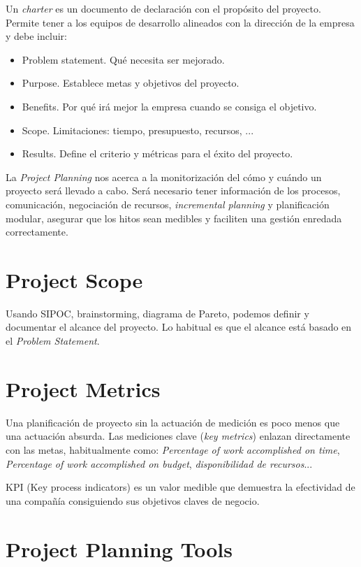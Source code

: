 \documentclass[oneside]{book}
\begin{document}
Un \textit{charter} es un documento de declaración con el propósito del proyecto.
Permite tener a los equipos de desarrollo alineados con la dirección de la empresa y debe incluir: 

\begin{itemize}
	\item Problem statement. Qué necesita ser mejorado.
	\item Purpose. Establece metas y objetivos del proyecto.
	\item Benefits. Por qué irá mejor la empresa cuando se consiga el objetivo.
	\item Scope. Limitaciones: tiempo, presupuesto, recursos, ...
	\item Results. Define el criterio y métricas para el éxito del proyecto.
\end{itemize}

La \textit{Project Planning} nos acerca a la monitorización del cómo y cuándo un proyecto será llevado a cabo. Será necesario tener información de los procesos, comunicación, negociación de recursos, \textit{incremental planning} y planificación modular, asegurar que los hitos sean medibles y faciliten una gestión enredada correctamente.

\section{Project Scope}

Usando SIPOC, brainstorming, diagrama de Pareto, podemos definir y documentar el alcance del proyecto. Lo habitual es que el alcance está basado en el \textit{Problem Statement}.

\section{Project Metrics}

Una planificación de proyecto sin la actuación de medición es poco menos que una actuación absurda. Las mediciones clave (\textit{key metrics}) enlazan directamente con las metas, habitualmente como: \textit{Percentage of work accomplished on time}, \textit{Percentage of work accomplished on budget}, \textit{disponibilidad de recursos}...

KPI (Key process indicators) es un valor medible que demuestra la efectividad de una compañía consiguiendo sus objetivos claves de negocio.

\section{Project Planning Tools}
\end{document}

